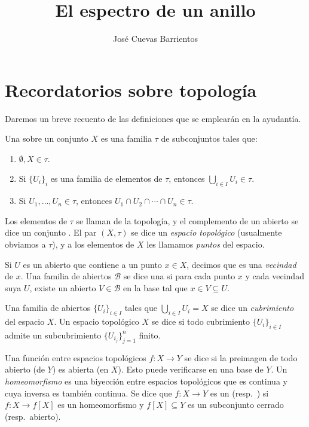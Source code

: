 \documentclass[11pt, reqno]{amsart}
\title{El espectro de un anillo}
\date{\DTMdate{2025-05-08}}
\author{José Cuevas Barrientos}
\begin{document}
\maketitle

\nocite{atiyah:commutative}
\nocite{matsumura:ring}

\section{Recordatorios sobre topología}
Daremos un breve recuento de las definiciones que se emplearán en la ayudantía.

Una  sobre un conjunto $X$ es una familia $\tau$ de subconjuntos tales que:
\begin{enumerate}[{Top}1., leftmargin=*]
	\item $\emptyset, X \in \tau$.
	\item Si $\{ U_i \}_i$ es una familia de elementos de $\tau$, entonces $\bigcup_{i\in I} U_i \in \tau$.
	\item Si $U_1, \dots, U_n \in \tau$, entonces $U_1 \cap U_2 \cap \cdots \cap U_n \in \tau$.
\end{enumerate}
Los elementos de $\tau$ se llaman  de la topología, y el complemento de un abierto se dice un
conjunto .
El par $(X, \tau)$ se dice un \emph{espacio topológico} (usualmente obviamos a $\tau$), y a los elementos de $X$ les
llamamos \emph{puntos} del espacio.

Si $U$ es un abierto que contiene a un punto $x \in X$, decimos que es una \emph{vecindad} de $x$.
Una familia de abiertos $\mathcal{B}$ se dice una  si para cada punto $x$ y cada vecindad
suya $U$, existe un abierto $V \in \mathcal{B}$ en la base tal que $x \in V \subseteq U$.

Una familia de abiertos $\{ U_i \}_{i\in I}$ tales que $\bigcup_{i\in I} U_i = X$ se dice un \emph{cubrimiento} del
espacio $X$.
Un espacio topológico $X$ se dice  si todo cubrimiento $\{ U_i \}_{i\in I}$ admite un
subcubrimiento $\{ U_{i_j} \}_{j=1}^n$ finito.

Una función entre espacios topológicos $f \colon X \to Y$ se dice  si la preimagen de todo abierto (de
$Y$) es abierta (en $X$).
Esto puede verificarse en una base de $Y$.
Un \emph{homeomorfismo} es una biyección entre espacios topológicos que es continua y cuya inversa es también
continua.
Se dice que $f \colon X \to Y$ es un  (resp.\ ) si $f \colon X \to f[X]$ es un
homeomorfismo y $f[X] \subseteq Y$ es un subconjunto cerrado (resp.\ abierto).
\end{document}
